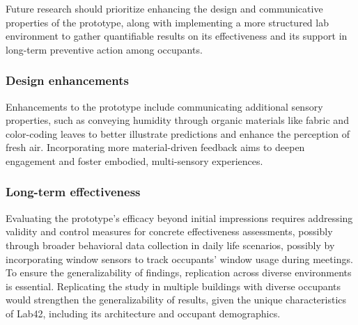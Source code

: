 Future research should prioritize enhancing the design and communicative properties of the prototype, along with implementing a more structured lab environment to gather quantifiable results on its effectiveness and its support in long-term preventive action among occupants. 

\subsubsection{Design enhancements}
Enhancements to the prototype include communicating additional sensory properties, such as conveying humidity through organic materials like fabric and color-coding leaves to better illustrate predictions and enhance the perception of fresh air. Incorporating more material-driven feedback aims to deepen engagement and foster embodied, multi-sensory experiences.

\subsubsection{Long-term effectiveness}
Evaluating the prototype's efficacy beyond initial impressions requires addressing validity and control measures for concrete effectiveness assessments, possibly through broader behavioral data collection in daily life scenarios, possibly by incorporating window sensors to track occupants' window usage during meetings. To ensure the generalizability of findings, replication across diverse environments is essential. Replicating the study in multiple buildings with diverse occupants would strengthen the generalizability of results, given the unique characteristics of Lab42, including its architecture and occupant demographics.
